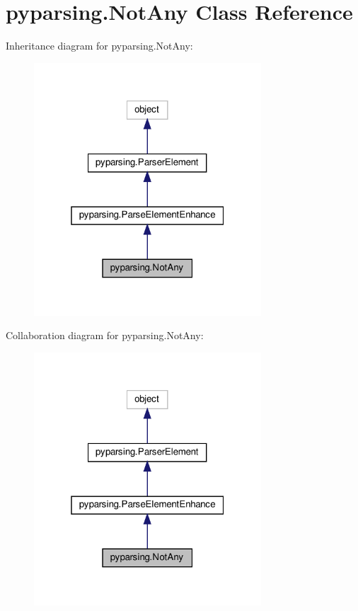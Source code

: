 \hypertarget{classpyparsing_1_1NotAny}{}\section{pyparsing.\+Not\+Any Class Reference}
\label{classpyparsing_1_1NotAny}


Inheritance diagram for pyparsing.\+Not\+Any\+:
\nopagebreak
\begin{figure}[H]
\begin{center}
\leavevmode
\includegraphics[width=241pt]{classpyparsing_1_1NotAny__inherit__graph}
\end{center}
\end{figure}


Collaboration diagram for pyparsing.\+Not\+Any\+:
\nopagebreak
\begin{figure}[H]
\begin{center}
\leavevmode
\includegraphics[width=241pt]{classpyparsing_1_1NotAny__coll__graph}
\end{center}
\end{figure}
